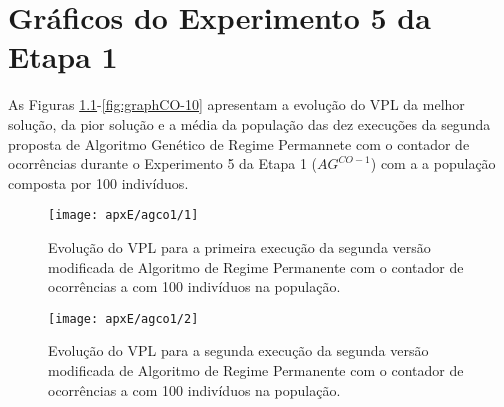 \chapter{Gráficos do Experimento 5 da Etapa 1}

As Figuras \ref{fig:graphCO-01}-\ref{fig:graphCO-10} apresentam a evolução do VPL da melhor solução, da pior solução e a média da população das dez execuções da segunda proposta de Algoritmo Genético de Regime Permannete com o contador de ocorrências durante o Experimento 5 da Etapa 1 ($AG^{CO-1}$) com a a população composta por 100 indivíduos.

\begin{figure}[H]
\centering

\texttt{[image: apxE/agco1/1]}
\caption{Evolução do VPL para a primeira execução da segunda versão modificada de Algoritmo de Regime Permanente com o contador de ocorrências a com 100 indivíduos na população.}
\label{fig:graphCO-01}
\end{figure}

\begin{figure}[H]
\centering

\texttt{[image: apxE/agco1/2]}
\caption{Evolução do VPL para a segunda execução da segunda versão modificada de Algoritmo de Regime Permanente com o contador de ocorrências a com 100 indivíduos na população.}
\label{fig:graphCO-02}
\end{figure}

